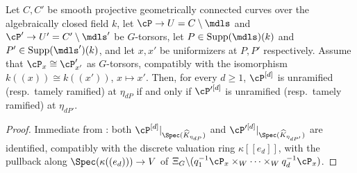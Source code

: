 \begin{cor}[Reduction to $\bP^1$]\label{cor:reduction_to_P1}
    Let $C, C'$ be smooth projective geometrically connected curves over the algebraically closed field $k$, let
    $\cP \to U = C \setminus \mdls$ and $\cP' \to U' = C' \setminus \mdls'$ be $G$-torsors, let
    $P \in \mathrm{Supp}(\mdls)(k)$ and $P' \in \mathrm{Supp}(\mdls')(k)$, and let $x, x'$ be uniformizers at $P, P'$
    respectively. Assume that $\cP_x \cong \cP'_{x'}$ as $G$-torsors, compatibly with the isomorphism
    $k((x)) \cong k((x'))$, $x \mapsto x'$.
    Then, for every $d\geq1$, $\cP^{[d]}$ is unramified
    (resp.\ tamely ramified) at $\eta_{dP}$ if and only if
    $\cP'^{[d]}$ is unramified (resp.\ tamely ramified) at $\eta_{dP'}$.
\end{cor}
\begin{proof}
    Immediate from : both $\cP^{[d]}|_{\Spec(\widehat{K}_{\eta_{dP}})}$ and
    $\cP'^{[d]}|_{\Spec(\widehat{K}_{\eta_{dP'}})}$ are identified, compatibly with the discrete valuation ring
    $\kappa[[e_d]]$, with the pullback along $\Spec(\kappa((e_d))) \to V$ of
    $\Xi_G \backslash (q_1^{-1}\cP_x \times_W \cdots \times_W q_d^{-1}\cP_x)$.
\end{proof}
